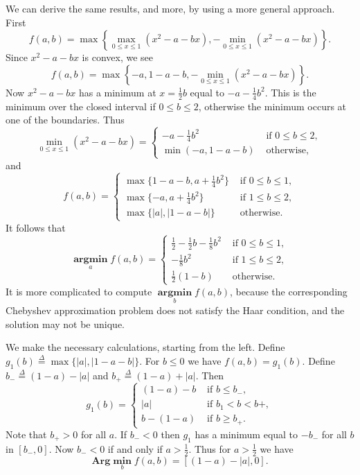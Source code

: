 \documentclass[
  12pt,
]{book}
\begin{document}
We can derive the same results, and more, by using a more general approach. First
\[
f(a,b)=
\max\left\{\max_{0\leq x\leq 1}(x^2-a-bx),-\min_{0\leq x\leq 1}(x^2-a-bx)\right\}.
\]
Since \(x^2-a-bx\) is convex, we see
\[
f(a,b)=
\max\left\{-a,1-a-b,-\min_{0\leq x\leq 1}(x^2-a-bx)\right\}.
\]
Now \(x^2-a-bx\) has a minimum at \(x=\frac12 b\) equal to \(-a-\frac14 b^2\). This is the minimum over the closed interval if \(0\leq b\leq 2\), otherwise the minimum occurs at one of the boundaries. Thus
\[
\min_{0\leq x\leq 1}(x^2-a-bx)=\begin{cases}
-a-\frac14 b^2&\text{ if }0\leq b\leq 2,\\
\min(-a,1-a-b)&\text{ otherwise},\end{cases}
\]
and
\[
f(a,b)=\begin{cases}
\max\{1-a-b,a+\frac14 b^2\}&\text{ if }0\leq b\leq 1,\\
\max\{-a,a+\frac14 b^2\}&\text{ if }1\leq b\leq 2,\\
\max\{|a|,|1-a-b|\}&\text{ otherwise}.\end{cases}
\]
It follows that
\[
\mathop{\mathbf{argmin}}\limits_{a} f(a,b)=\begin{cases}
\frac12-\frac12 b-\frac18b^2&\text{ if }0\leq b\leq 1,\\
-\frac18 b^2&\text{ if }1\leq b\leq 2,\\
\frac12(1-b)&\text{ otherwise}.\end{cases}
\]
It is more complicated to compute \(\mathop{\mathbf{argmin}}\limits_{b} f(a,b)\), because the corresponding Chebyshev approximation problem does not satisfy the Haar condition, and the solution may not be unique.

We make the necessary calculations, starting from the left. Define \(g_1(b)\mathop{=}\limits^{\Delta}\max\{|a|,|1-a-b|\}\). For \(b\leq 0\) we have \(f(a,b)=g_1(b)\).
Define \(b_-\mathop{=}\limits^{\Delta}(1-a)-|a|\) and \(b_+\mathop{=}\limits^{\Delta}(1-a)+|a|\). Then
\[
g_1(b)=
\begin{cases}
(1-a)-b&\text{ if }b\leq b_-,\\
|a|&\text{ if }b_1<b<b+,\\
b-(1-a)&\text{ if }b\geq b_+.
\end{cases}
\]
Note that \(b_+>0\) for all \(a\). If \(b_-<0\) then \(g_1\) has a minimum equal to \(-b_-\) for all \(b\) in \([b_-,0]\). Now \(b_-<0\) if and only if \(a>\frac12\).
Thus for \(a>\frac12\) we have
\[
\mathbf{Arg}\mathop{\mathbf{min}}\limits_{b}f(a,b)=[(1-a)-|a|,0].
\]
\end{document}
